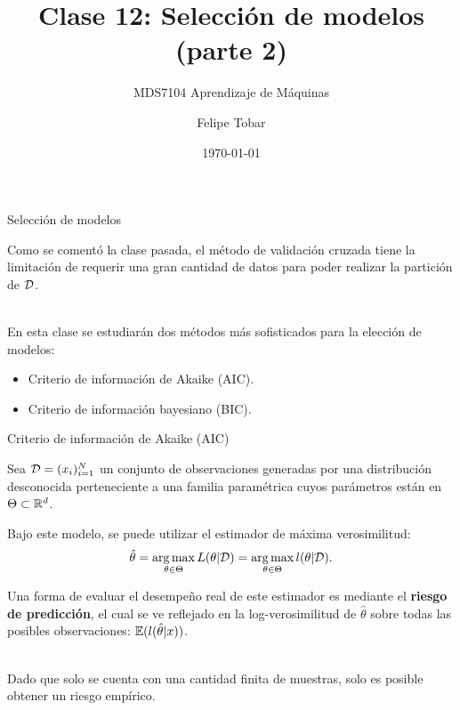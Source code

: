 \documentclass[handout, 9pt]{beamer}
\title{Clase 12: Selección de modelos (parte 2)}
\subtitle{MDS7104 Aprendizaje de Máquinas}
\date{\today}
\author{Felipe Tobar}
\institute{Iniciativa de Datos e Inteligencia Artificial\\Universidad de Chile}
\begin{document}
\begin{frame}
  \titlepage
\end{frame}

\begin{frame}{Selección de modelos}

Como se comentó la clase pasada, el método de validación cruzada tiene la limitación de requerir una gran cantidad de datos para poder realizar la partición de ${\mathcal D}$.\\~\ \pause

En esta clase se estudiarán dos métodos más sofisticados para la elección de modelos:

\begin{itemize}
	\item Criterio de información de Akaike (AIC).
	\item Criterio de información bayesiano (BIC).
\end{itemize}
	
\end{frame}


\begin{frame}{Criterio de información de Akaike (AIC)}

Sea ${\mathcal D}=(x_i)_{i=1}^N$ un conjunto de observaciones generadas por una distribución desconocida perteneciente a una familia paramétrica cuyos parámetros están en $\Theta\subset\mathbb{R}^d$.\\ \pause

Bajo este modelo, se puede utilizar el estimador de máxima verosimilitud:
\begin{equation*}
	\hat{\theta} = \operatorname*{arg\,max}_{\theta\in\Theta} L(\theta|{\mathcal D}) =  \operatorname*{arg\,max}_{\theta\in\Theta} l(\theta|{\mathcal D}).
\end{equation*}

Una forma de evaluar el desempeño real de este estimador es mediante el \textbf{riesgo de predicción}, el cual se ve reflejado en la log-verosimilitud de $\hat{\theta}$ sobre todas las posibles observaciones: $\operatorname{\mathbb{E}}(l(\hat{\theta}|x))$.\\~\ \pause

Dado que solo se cuenta con una cantidad finita de muestras, solo es posible obtener un riesgo empírico.\\

\end{frame}
\end{document}
